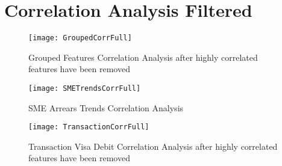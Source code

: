 
\chapter{Correlation Analysis Filtered} %

\label{AppendixC} %



\begin{figure}[H]
	\texttt{[image: GroupedCorrFull]}
	\caption{Grouped Features Correlation Analysis after highly correlated features have been removed}
	\label{fig:GroupedCorrFull}
\end{figure}

\begin{figure}[H]
	\texttt{[image: SMETrendsCorrFull]}
	\caption[SME Arrears Trends Correlation Analysis after highly correlated features have been removed]
	{SME Arrears Trends Correlation Analysis}
	\label{fig:SMETrendsCorrFull}
\end{figure}
\begin{figure}[H]
	\texttt{[image: TransactionCorrFull]}
	\caption{Transaction Visa Debit Correlation Analysis after highly correlated features have been removed}
	\label{fig:TransactionCorrFull}
\end{figure}